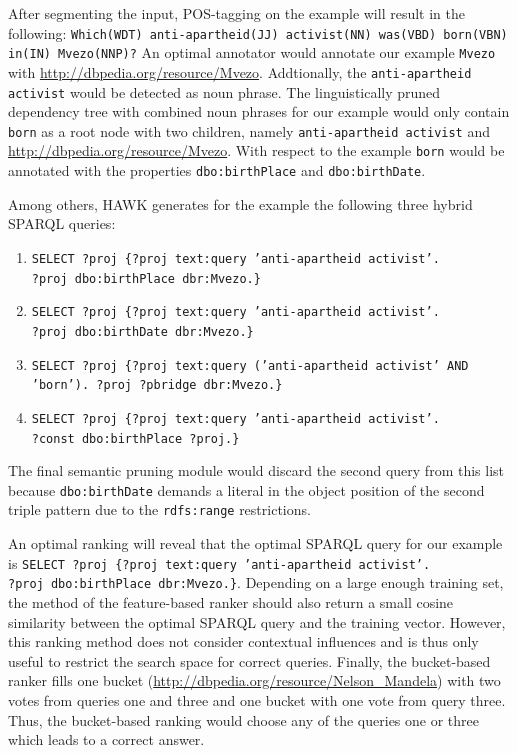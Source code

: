After segmenting the input, POS-tagging on the  example will result in the following: \texttt{Which(WDT) anti-apartheid(JJ) activist(NN) was(VBD) born(VBN) in(IN) Mvezo(NNP)?}
An optimal annotator would annotate our  example \texttt{Mvezo} with \url{http://dbpedia.org/resource/Mvezo}.
Addtionally, the \texttt{anti-apartheid activist} would be detected as noun phrase.
The linguistically pruned dependency tree with combined noun phrases for our  example would only contain \texttt{born} as a root node with two children, namely \texttt{anti-apartheid activist} and \url{http://dbpedia.org/resource/Mvezo}.
With respect to the  example \texttt{born} would be annotated with the properties \texttt{dbo:birthPlace} and \texttt{dbo:birthDate}.

Among others, HAWK generates for the  example the following three hybrid SPARQL queries:
\begin{enumerate}
\item \texttt{SELECT ?proj  \{?proj text:query 'anti-apartheid activist'.\\ ?proj dbo:birthPlace dbr:Mvezo.\}}
\item \texttt{SELECT ?proj  \{?proj text:query 'anti-apartheid activist'.\\ ?proj dbo:birthDate dbr:Mvezo.\}}
\item \texttt{SELECT ?proj  \{?proj text:query ('anti-apartheid activist' AND \\ 'born'). ?proj ?pbridge dbr:Mvezo.\}}
\item \texttt{SELECT ?proj  \{?proj text:query 'anti-apartheid activist'.\\ ?const dbo:birthPlace ?proj.\}}
\end{enumerate}

The final semantic pruning module would discard the second query from this list because \texttt{dbo:birthDate} demands a literal in the object position of the second triple pattern due to the \texttt{rdfs:range} restrictions.

An optimal ranking will reveal that the optimal SPARQL query for our example is \texttt{SELECT ?proj  \{?proj text:query 'anti-apartheid activist'.\\ ?proj dbo:birthPlace dbr:Mvezo.\}}.
Depending on a large enough training set, the method of the feature-based ranker should also return a small cosine similarity between the optimal SPARQL query and the training vector. 
However, this ranking method does not consider contextual influences and is thus only useful to restrict the search space for correct queries.
Finally, the bucket-based ranker fills one bucket (\url{http://dbpedia.org/resource/Nelson_Mandela}) with two votes from queries one and three and one bucket with one vote from query three. 
Thus, the bucket-based ranking would choose any of the queries one or three which leads to a correct answer.



